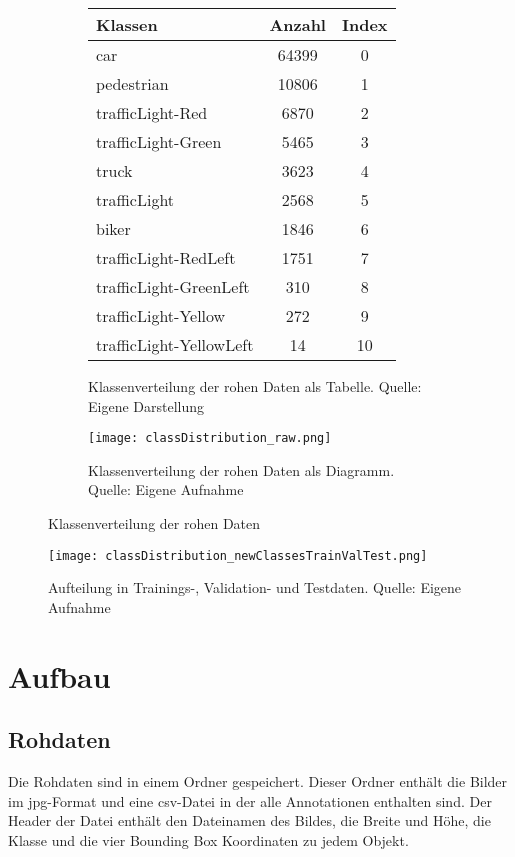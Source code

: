 \begin{figure}
	\begin{subfigure}{0.5\textwidth}
		\centering
		\begin{tabular}{l|c|c}
			\hline
			Klassen & Anzahl & Index \\
			\hline
			\hline
			car & 64399 & 0 \\
			pedestrian & 10806 & 1 \\
			trafficLight-Red & 6870 & 2 \\
			trafficLight-Green & 5465 & 3 \\
			truck & 3623 & 4 \\
			trafficLight & 2568 & 5 \\
			biker & 1846 & 6 \\
			trafficLight-RedLeft & 1751 & 7 \\
			trafficLight-GreenLeft & 310 & 8 \\
			trafficLight-Yellow & 272 & 9 \\
			trafficLight-YellowLeft & 14 & 10 \\
			\hline
		\end{tabular}
		\caption{Klassenverteilung der rohen Daten als Tabelle. Quelle: Eigene Darstellung}
		\label{tab:classDistributionRaw_graph}
	\end{subfigure}%
	\begin{subfigure}{0.5\textwidth}
	\centering
	\texttt{[image: classDistribution\_raw.png]}
	\caption[Klassenverteilung der rohen Daten als Diagramm]{Klassenverteilung der rohen Daten als Diagramm. Quelle: Eigene Aufnahme}
	\label{fig:classDistributionRaw_graph}
	\end{subfigure}%
	\caption{Klassenverteilung der rohen Daten}
	\label{fig:classDistributionRaw}
\end{figure}


\begin{figure}
	\centering
		\texttt{[image: classDistribution\_newClassesTrainValTest.png]}
		\caption[Aufteilung in Trainings-, Validation- und Testdaten]{Aufteilung in Trainings-, Validation- und Testdaten. Quelle: Eigene Aufnahme}
		\label{fig:datasetTrainValTestSplit}
\end{figure}


\section{Aufbau}
\subsection{Rohdaten}
Die Rohdaten sind in einem Ordner gespeichert. Dieser Ordner enthält die Bilder im jpg-Format und eine csv-Datei in der alle Annotationen enthalten sind. Der Header der Datei enthält den Dateinamen des Bildes, die Breite und Höhe, die Klasse und die vier Bounding Box Koordinaten zu jedem Objekt.

